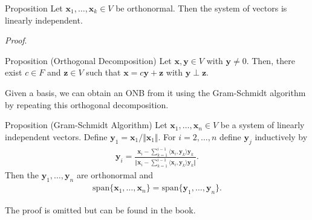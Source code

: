 \documentclass [aspectratio=169]{beamer}
\newcommand{\bx}{{\mathbf{x}}}
\newcommand{\by}{{\mathbf{y}}}
\newcommand{\bz}{{\mathbf{z}}}
\newcommand{\innerprod}[1]{\langle #1 \rangle}
\begin{document}
\begin{frame}
\begin{exampleblock}{Proposition}
Let $\bx_1,\ldots, \bx_k\in V$ be orthonormal. Then the system of vectors is linearly independent.
\end{exampleblock}

\textit{Proof}.
\vspace{5.5cm}
\end{frame}


\begin{frame}
\begin{exampleblock}{Proposition (Orthogonal Decomposition)}
Let $\bx,\by\in V$ with $\by \neq 0$. Then, there exist $c\in F$ and $\bz\in V$ such that $\bx = c\by + \bz$ with $\by \perp \bz$.
\end{exampleblock}

\vspace{1em}

Given a basis, we can obtain an ONB from it using the Gram-Schmidt algorithm by repeating this orthogonal decomposition.
\end{frame}

\begin{frame}
\begin{exampleblock}{Proposition (Gram-Schmidt Algorithm)}
Let $\bx_1,\ldots, \bx_n \in V$ be a system of linearly independent vectors. Define $\by_1 = \bx_1/\Vert \bx_1 \Vert$. For $i = 2,\ldots,n$ define $\by_j$ inductively by
\begin{align*}
    \by_i = \frac{\bx_i-\sum_{k=1}^{i-1} \innerprod{\bx_i,\by_k}\by_k}{\Vert \bx_i-\sum_{k=1}^{i-1} \innerprod{\bx_i,\by_k}\by_k\Vert}.
\end{align*}
Then the $\by_1, \ldots, \by_n$ are orthonormal and 
\begin{align*}
    \mathrm{span}\{\bx_1,\ldots,\bx_n\} = \mathrm{span}\{\by_1,\ldots,\by_n\}.
\end{align*}
\end{exampleblock}

The proof is omitted but can be found in the book.
\end{frame}
\end{document}
